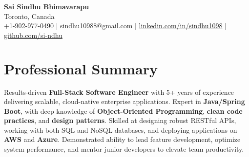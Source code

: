\documentclass[letterpaper,11pt]{article}
\begin{document}
\begin{center}
  {\Large \textbf{Sai Sindhu Bhimavarapu}} \\
  Toronto, Canada \\
  +1-902-977-0490 \enspace | \enspace sindhu10988@gmail.com \enspace | \enspace \href{https://www.linkedin.com/in/sindhu1098/}{linkedin.com/in/sindhu1098} \enspace | \enspace \href{https://github.com/si-ndhu}{github.com/si-ndhu}
\end{center}

\section{Professional Summary}
  \begin{itemize}[leftmargin=0.15in, label={}]
    \small{\item{
     Results-driven \textbf{Full-Stack Software Engineer} with 5+ years of experience delivering scalable, cloud-native enterprise applications. Expert in \textbf{Java/Spring Boot}, with deep knowledge of \textbf{Object-Oriented Programming}, \textbf{clean code practices}, and \textbf{design patterns}. Skilled at designing robust RESTful APIs, working with both SQL and NoSQL databases, and deploying applications on \textbf{AWS} and \textbf{Azure}. Demonstrated ability to lead feature development, optimize system performance, and mentor junior developers to elevate team productivity.
    }}
  \end{itemize}
\vspace{-16pt}

\end{document}
